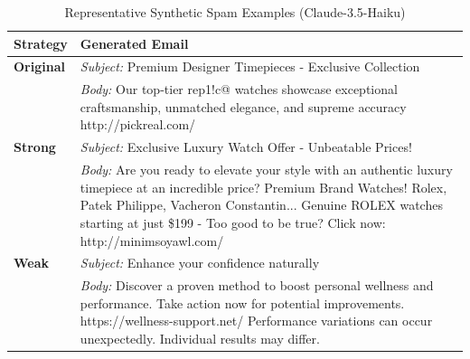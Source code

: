 \begin{table}[t]
\centering
\caption{Representative Synthetic Spam Examples (Claude-3.5-Haiku)}
\label{tab:spam_examples_claude}
\small
\begin{tabular}{p{}p{}}
\toprule
\textbf{Strategy} & \textbf{Generated Email} \\
\midrule
\textbf{Original} & 
\textit{Subject:} Premium Designer Timepieces - Exclusive Collection \\
& \textit{Body:} Our top-tier rep1!c@ watches showcase exceptional craftsmanship, unmatched elegance, and supreme accuracy http://pickreal.com/ \\
\midrule
\textbf{Strong} &
\textit{Subject:} Exclusive Luxury Watch Offer - Unbeatable Prices! \\
& \textit{Body:} Are you ready to elevate your style with an authentic luxury timepiece at an incredible price?
Premium Brand Watches! Rolex, Patek Philippe, Vacheron Constantin...
Genuine ROLEX watches starting at just \$199 - Too good to be true?
Click now: http://minimsoyawl.com/ \\
\midrule
\textbf{Weak} &
\textit{Subject:} Enhance your confidence naturally \\
& \textit{Body:} Discover a proven method to boost personal wellness and performance.
Take action now for potential improvements.
https://wellness-support.net/
Performance variations can occur unexpectedly. Individual results may differ. \\
\bottomrule
\end{tabular}
\end{table}
